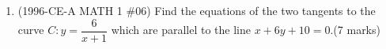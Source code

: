 \documentclass[12pt]{article}
\begin{document}
\begin{enumerate}
            \hrulefill
            
            \hrulefill
            
            \hrulefill
            
            \hrulefill
            
            \hrulefill
            
            \hrulefill
            
            \hrulefill
            
            \hrulefill
            
            \hrulefill
            
            \hrulefill
            
            \hrulefill
            
            \hrulefill
            
            \hrulefill
            
            \hrulefill

        \pagebreak
        \item (1996-CE-A MATH 1 \#06) Find the equations of the two tangents to the curve $C:y=\dfrac{6}{x+1}$ which are parallel to the line $x+6y+10=0$.\hfill(7 marks)
        
        \hrulefill
            
            \hrulefill
            
            \hrulefill
            
            \hrulefill
            
            \hrulefill
            
            \hrulefill
            
            \hrulefill
            
            \hrulefill
            
            \hrulefill
            
            \hrulefill
            
            \hrulefill
            
            \hrulefill
            
            \hrulefill
            
            \hrulefill

            \hrulefill
            
            \hrulefill
            
            \hrulefill
            

\end{enumerate}
\end{document}
